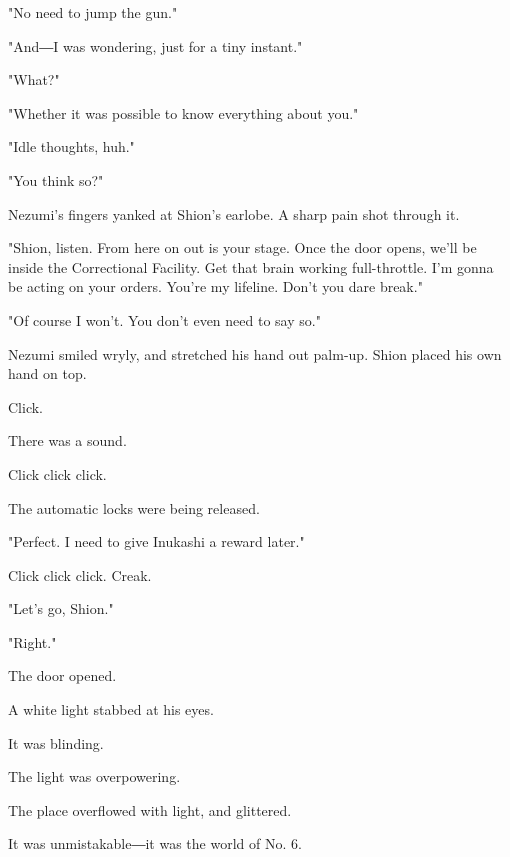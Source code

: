 "No need to jump the gun."

"And―I was wondering, just for a tiny instant."

"What?"

"Whether it was possible to know everything about you."

"Idle thoughts, huh."

"You think so?"

Nezumi's fingers yanked at Shion's earlobe. A sharp pain shot through
it.

"Shion, listen. From here on out is your stage. Once the door opens,
we'll be inside the Correctional Facility. Get that brain working
full-throttle. I'm gonna be acting on your orders. You're my lifeline.
Don't you dare break."

"Of course I won't. You don't even need to say so."

Nezumi smiled wryly, and stretched his hand out palm-up. Shion placed
his own hand on top.

Click.

There was a sound.

Click click click.

The automatic locks were being released.

"Perfect. I need to give Inukashi a reward later."

Click click click. Creak.

"Let's go, Shion."

"Right."

The door opened.

A white light stabbed at his eyes.

It was blinding.

The light was overpowering.

The place overflowed with light, and glittered.

It was unmistakable―it was the world of No. 6.
